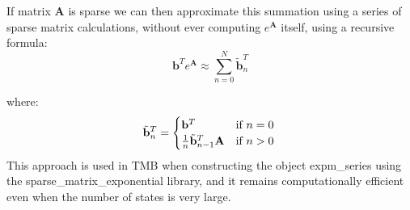 \begin{enumerate}
    If matrix \(\mathbf{A}\) is sparse we can then approximate this summation using a series of sparse matrix calculations, without ever computing \( e^\mathbf{A} \) itself, using a recursive formula:
    \begin{equation} 
      \mathbf{b}^T e^\mathbf{A} \approx \sum_{n=0}^{N} \tilde{\mathbf{b}}_n^T
    \end{equation}

    where:
    \begin{equation} 
      \tilde{\mathbf{b}}_n^T = 
        \begin{cases}
            \mathbf{b}^T & \text{if } n=0 \\ 
            \frac{1}{n} \tilde{\mathbf{b}}_{n-1}^T \mathbf{A} & \text{if } n>0 
        \end{cases} \\
    \end{equation}
    This approach is used in TMB when constructing the object \colorbox{backblue}{expm\_series} using the \colorbox{backblue}{sparse\_matrix\_exponential} library, and it remains computationally efficient even when the number of states is very large.    
\end{enumerate}

